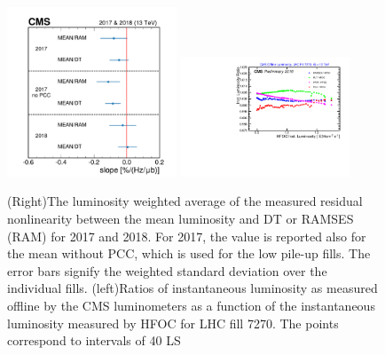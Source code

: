 \begin{figure}[!h]
\centering
\includegraphics[width=0.45\textwidth]{figures/luminosity_integration_and_uncertainty/linearity_means_clean3.pdf}
\hspace*{0.05\textwidth}
\includegraphics[width=0.45\textwidth]{figures/linearity_7270.pdf}
\caption[Residual Nonlinearity and Luminosity Ratios (2017 & 2018)]{(Right)The luminosity weighted average of the measured residual nonlinearity between the mean luminosity and DT or RAMSES (RAM) for 2017 and 2018. For 2017, the value is reported also for the mean without PCC, which is used for the low pile-up fills. The error bars signify the weighted standard deviation over the individual fills. (left)Ratios of instantaneous luminosity as measured offline by the CMS luminometers as a function of the instantaneous luminosity measured by HFOC for LHC fill 7270. The points correspond to intervals of 40 LS}
\label{fig:stabilitylinearity:linearity3}
\end{figure}







